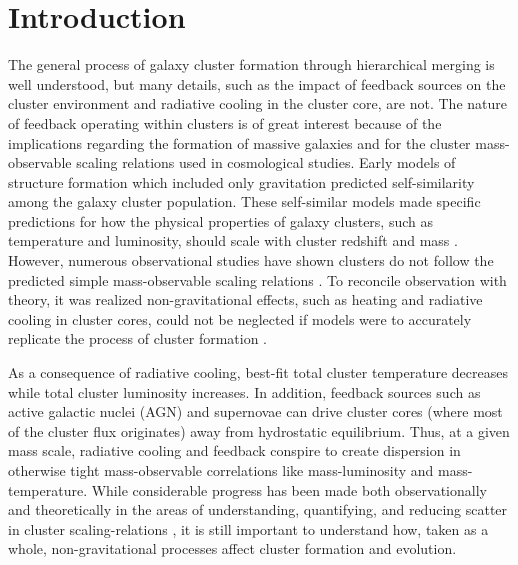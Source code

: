 \section{Introduction}
\label{sec:entsuppintro}

The general process of galaxy cluster formation through hierarchical
merging is well understood, but many details, such as the impact of
feedback sources on the cluster environment and radiative cooling in
the cluster core, are not. The nature of feedback operating within
clusters is of great interest because of the implications regarding
the formation of massive galaxies and for the cluster mass-observable
scaling relations used in cosmological studies. Early models of
structure formation which included only gravitation predicted
self-similarity among the galaxy cluster population. These
self-similar models made specific predictions for how the physical
properties of galaxy clusters, such as temperature and luminosity,
should scale with cluster redshift and mass \citep{kaiser86, kaiser91,
1991ApJ...383...95E, nfw1, nfw2, 1996ApJ...469..494E,
1997MNRAS.292..289E, 1997ApJ...480...36T, 1998ApJ...503..569E,
1998ApJ...495...80B}. However, numerous observational studies have
shown clusters do not follow the predicted simple mass-observable
scaling relations \citep{edge91, 1998MNRAS.297L..57A,
1998ApJ...504...27M, 1999MNRAS.305..631A, 1999ApJ...520...78H,
2000ApJ...536...73N, 2001A&A...368..749F}. To reconcile observation
with theory, it was realized non-gravitational effects, such as
heating and radiative cooling in cluster cores, could not be neglected
if models were to accurately replicate the process of cluster
formation \citep[\eg][]{kaiser91, 1991ApJ...383...95E,
2000ApJ...532...17L, 2002MNRAS.336..409B}.

As a consequence of radiative cooling, best-fit total cluster
temperature decreases while total cluster luminosity increases. In
addition, feedback sources such as active galactic nuclei (AGN) and
supernovae can drive cluster cores (where most of the cluster flux
originates) away from hydrostatic equilibrium. Thus, at a given mass
scale, radiative cooling and feedback conspire to create dispersion in
otherwise tight mass-observable correlations like mass-luminosity and
mass-temperature. While considerable progress has been made both
observationally and theoretically in the areas of understanding,
quantifying, and reducing scatter in cluster scaling-relations
\citep{1996ApJ...458...27B, 2005ApJ...624..606J, kravtsov06, nagai07,
VV08}, it is still important to understand how, taken as a whole,
non-gravitational processes affect cluster formation and evolution.

